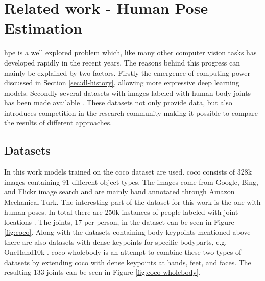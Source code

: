 \chapter{Related work - Human Pose Estimation} \label{sec:pose_estimation}
\gls{hpe} is a well explored problem which, like many other computer vision tasks has developed rapidly in the recent years. The reasons behind this progress can mainly be explained by two factors. Firstly the emergence of computing power discussed in Section \ref{sec:dl-history}, allowing more expressive deep learning models. Secondly several datasets with images labeled with human body joints has been made available \cite{Chen2020}. These datasets not only provide data, but also introduces competition in the research community making it possible to compare the results of different approaches.

\section{Datasets} \label{sec:datasets}

In this work models trained on the \gls{coco} dataset are used. \gls{coco} consists of 328k images containing 91 different object types. The images come from Google, Bing, and Flickr image search and are mainly hand annotated through Amazon Mechanical Turk. The interesting part of the dataset for this work is the one with human poses. In total there are 250k instances of people labeled with joint locations \cite{Lin2014}. The joints, 17 per person, in the dataset can be seen in Figure \ref{fig:coco}. Along with the datasets containing body keypoints mentioned above there are also datasets with dense keypoints for specific bodyparts, e.g. OneHand10k \cite{Wang2019}. \gls{coco}-wholebody \cite{Jin2020} is an attempt to combine these two types of datasets by extending \gls{coco} with dense keypoints at hands, feet, and faces. The resulting 133 joints can be seen in Figure \ref{fig:coco-wholebody}.

